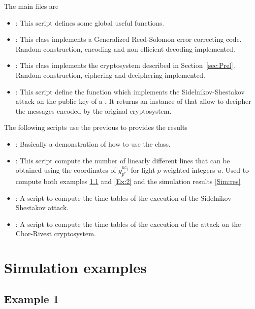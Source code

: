 \documentclass[a4paper]{article}
\begin{document}
The main files are
\begin{itemize}
\item {}: This script defines some global useful functions.
\item {}: This class implements a Generalized Reed-Solomon error correcting code. Random construction, encoding and non efficient decoding implemented.
\item {}: This class implements the cryptosystem described in Section~\ref{sec:Prel}. Random construction, ciphering and deciphering implemented.
\item {}: This script define the function  which implements the Sidelnikov-Shestakov attack on the public key of a . It returns an instance of  that allow to decipher the messages encoded by the original cryptosystem.
\end{itemize}
The following scripts use the previous to provides the results
\begin{itemize}
\item {}: Basically a demonstration of how to use the  class.
\item {}: This script compute the number of linearly different lines that can be obtained using the coordinates of $g_{p^r}^{uc_j}$ for light $p$-weighted integers $u$. Used to compute both examples \ref{Ex:1} and \ref{Ex:2} and the simulation results \ref{Sim:res}
\item {}: A script to compute the time tables of the execution of the Sidelnikov-Shestakov attack.
\item {}: A script to compute the time tables of the execution of the attack on the Chor-Rivest cryptosystem.
\end{itemize}


\newpage
\section{Simulation examples}

\subsection{Example 1}
\label{Ex:1}
\end{document}
